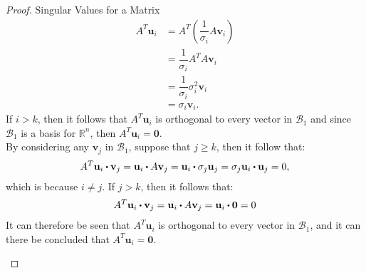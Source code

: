 \begin{proof}{Singular Values for a Matrix}
    \begin{align*}
        A^T\mathbf{u}_i &= A^T \left(\dfrac{1}{\sigma_i}A\mathbf{v}_i \right)\\
        &= \dfrac{1}{\sigma_i}A^TA\mathbf{v}_i\\
        &= \dfrac{1}{\sigma_i}\sigma_i^2\mathbf{v}_i\\
        &=\sigma_i\mathbf{v}_i.
    \end{align*}
    If $i>k$, then it follows that $A^T\mathbf{u}_i$ is orthogonal to every vector in $\mathcal{B}_1$ and since $\mathcal{B}_1$ is a basis for $\mathbb{R}^n$, then $A^T\mathbf{u}_i=\mathbf{0}$. \\ By considering any $\mathbf{v}_j$ in $\mathcal{B}_1$, suppose that $j\geq k$, then it follow that: 
    \begin{align*}
        A^T\mathbf{u}_i \vprik \mathbf{v}_j = \mathbf{u}_i \vprik A\mathbf{v}_j = \mathbf{u}_i \vprik \sigma_j\mathbf{u}_j = \sigma_j\mathbf{u}_i \vprik \mathbf{u}_j =0,
    \end{align*}
    which is because $i\neq j$. If $j>k$, then it follows that:
    \begin{align*}
        A^T\mathbf{u}_i \vprik \mathbf{v}_j = \mathbf{u}_i \vprik A\mathbf{v}_j= \mathbf{u}_i \vprik \mathbf{0}=0
    \end{align*}
    It can therefore be seen that $A^T\mathbf{u}_i$ is orthogonal to every vector in $\mathcal{B}_1$, and it can there be concluded that $A^T\mathbf{u}_i = \mathbf{0}$.
    \qedsymbol


\noindent\cite[439-440]{LiAl}
\end{proof}




